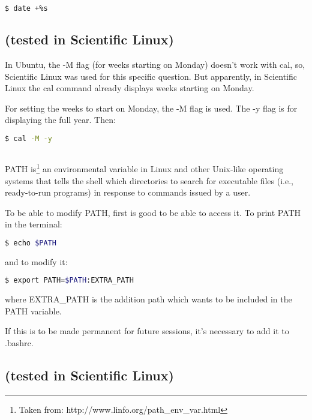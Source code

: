\documentclass[paper=a4, fontsize=11pt]{scrartcl} %
\numberwithin{equation}{section} %
\numberwithin{figure}{section} %
\numberwithin{table}{section} %
\begin{document}
\begin{onehalfspacing}
\begin{lstlisting}[language=bash]
  $ date +%s
\end{lstlisting}



\subsection{\textbf{(tested in Scientific Linux)}}

In Ubuntu, the -M flag (for weeks starting on Monday) doesn't work with cal, so, Scientific Linux was used for this specific question. But apparently, in Scientific Linux the cal command already displays weeks starting on Monday.

For setting the weeks to start on Monday, the -M flag is used. The -y flag is for displaying the full year. Then:

\begin{lstlisting}[language=bash]
  $ cal -M -y
\end{lstlisting}


\subsection{\textbf{}}

PATH is\footnote{Taken from: http://www.linfo.org/path\_env\_var.html} an environmental variable in Linux and other Unix-like operating systems that tells the shell which directories to search for executable files (i.e., ready-to-run programs) in response to commands issued by a user.

To be able to modify PATH, first is good to be able to access it. To print PATH in the terminal:

\begin{lstlisting}[language=bash]
  $ echo $PATH
\end{lstlisting}

and to modify it:

\begin{lstlisting}[language=bash]
  $ export PATH=$PATH:EXTRA_PATH
\end{lstlisting}

where EXTRA\_PATH is the addition path which wants to be included in the PATH variable.

If this is to be made permanent for future sessions, it's necessary to add it to .bashrc.

\subsection{\textbf{(tested in Scientific Linux)}}


\end{onehalfspacing}
\end{document}
